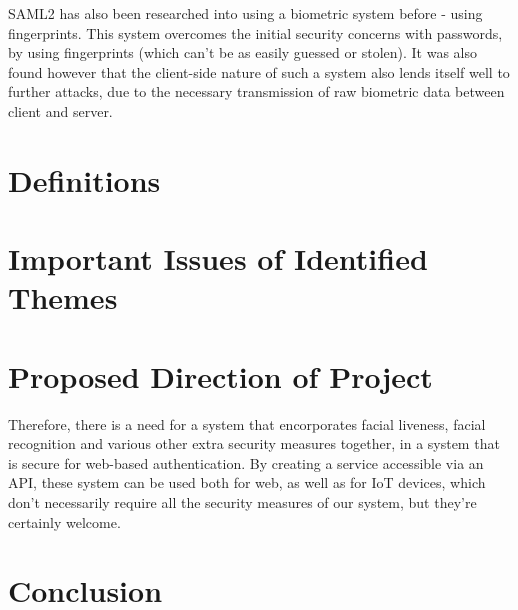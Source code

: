 \documentclass[14pt]{article}
\begin{document}
SAML2 has also been researched into using a biometric system before - using fingerprints. This system
overcomes the initial security concerns with passwords, by using fingerprints (which can't be as easily guessed or
stolen). It was also found however that the client-side nature of such a system also lends itself well to further attacks,
due to the necessary transmission of raw biometric data between client and server. \cite{SAMLFingerPrint}
\section{Definitions}


\section{Important Issues of Identified Themes}



\section{Proposed Direction of Project}
Therefore, there is a need for a system that encorporates facial liveness, facial recognition and various other
extra security measures together, in a system that is secure for web-based authentication. By creating a service
accessible via an API, these system can be used both for web, as well as for IoT devices, which don't necessarily require
all the security measures of our system, but they're certainly welcome.
\section{Conclusion}
\label{references}
\printbibliography
\end{document}
